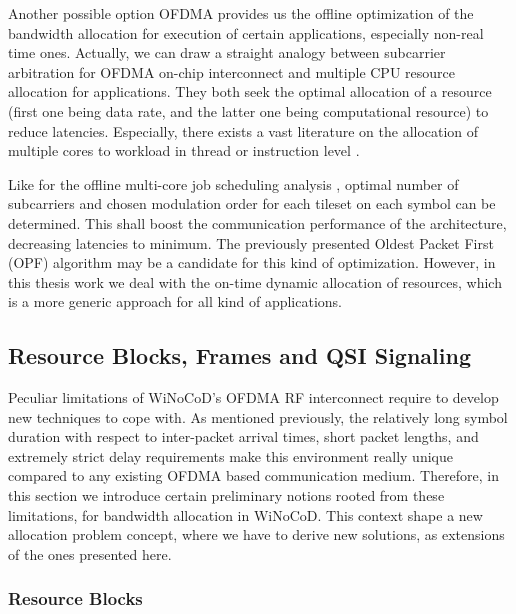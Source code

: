 Another possible option OFDMA provides us the offline optimization of the bandwidth allocation for execution of certain applications, especially non-real time ones. Actually, we can draw a straight analogy between subcarrier arbitration for OFDMA on-chip interconnect and multiple CPU resource allocation for applications. They both seek the optimal allocation of a resource (first one being data rate, and the latter one being computational resource) to reduce latencies. Especially, there exists a vast literature on the allocation of multiple cores to workload in thread or instruction level \cite{frachtenberg2009job}. 

Like for the offline multi-core job scheduling analysis \cite{pricopi2014task}, optimal number of subcarriers and chosen modulation order for each tileset on each symbol can be determined. This shall boost the communication performance of the architecture, decreasing latencies to minimum. The previously presented Oldest Packet First (OPF) algorithm may be a candidate for this kind of optimization. However, in this thesis work we deal with the on-time dynamic allocation of resources, which is a more generic approach for all kind of applications. 

\subsection{Resource Blocks, Frames and QSI Signaling}

Peculiar limitations of WiNoCoD's OFDMA RF interconnect require to develop new techniques to cope with. As mentioned previously, the relatively long symbol duration with respect to inter-packet arrival times, short packet lengths, and extremely strict delay requirements make this environment really unique compared to any existing OFDMA based communication medium. Therefore, in this section we introduce certain preliminary notions rooted from these limitations, for bandwidth allocation in WiNoCoD. This context shape a new allocation problem concept, where we have to derive new solutions, as extensions of the ones presented here.     

\subsubsection{Resource Blocks}

